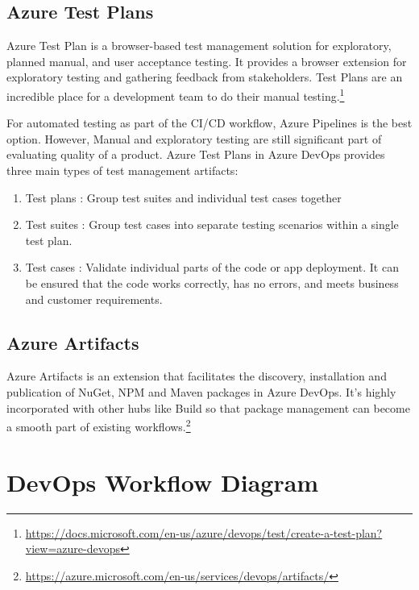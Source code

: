 \documentclass{article}
\begin{document}
\subsection{Azure Test Plans}

Azure Test Plan is a browser-based test management solution for exploratory, planned manual, and user acceptance testing. It provides a browser extension for exploratory testing and gathering feedback from stakeholders. Test Plans are an incredible place for a development team to do their manual testing.\footnote{\url{https://docs.microsoft.com/en-us/azure/devops/test/create-a-test-plan?view=azure-devops}}

\par

For automated testing as part of the CI/CD workflow, Azure Pipelines is the best option. However, Manual and exploratory testing are still significant part of evaluating quality of a product. Azure Test Plans in Azure DevOps provides three main types of test management artifacts: 

\par

\begin{enumerate}
    \item Test plans : Group test suites and individual test cases together
    \item Test suites : Group test cases into separate testing scenarios within a single test plan. 
    \item Test cases : Validate individual parts of the code or app deployment. It can be ensured that the code works correctly, has no errors, and meets business and customer requirements.
\end{enumerate}


\subsection{Azure Artifacts}

Azure Artifacts is an extension that facilitates the discovery, installation and publication of NuGet, NPM and Maven packages in Azure DevOps. It’s highly incorporated with other hubs like Build so that package management can become a smooth part of existing workflows.\footnote{\url{https://azure.microsoft.com/en-us/services/devops/artifacts/}}

\section{DevOps Workflow Diagram}
\end{document}
